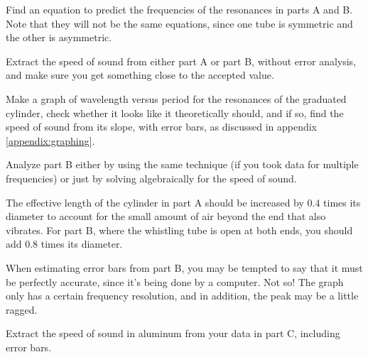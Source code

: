 \prelab

\prelabquestion   Find an equation to predict the frequencies of the
resonances in parts A and B. Note that they will not be
the same equations, since one tube is symmetric and the
other is asymmetric.

\selfcheck

Extract the speed of sound from either part A or part B,
without error analysis, and make sure you get something
close to the accepted value.

\analysis

Make a graph of wavelength versus period for the resonances
of the graduated cylinder, check whether it looks like it
theoretically should, and if so, find the speed of sound
from its slope, with error bars, as discussed in appendix
\ref{appendix:graphing}.

Analyze part B either by using the same technique (if you
took data for multiple frequencies) or just by solving algebraically for
the speed of sound.

The effective length of the cylinder in part A should be
increased by 0.4 times its diameter to account for the small
amount of air beyond the end that also vibrates.  For part
B, where the whistling tube is open at both ends, you
should add 0.8 times its diameter.

When estimating error bars from part B, you may be tempted
to say that it must be perfectly accurate, since it's being
done by a computer.  Not so!  The graph only has a certain frequency
resolution, and in addition, the peak may be
a little ragged.

Extract the speed of sound in aluminum from your data in
part C, including error bars.
